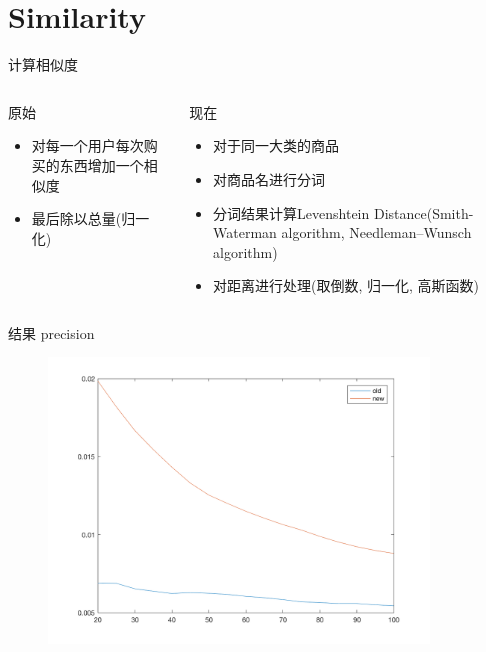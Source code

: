 \documentclass{beamer}
\begin{document}
  \section{Similarity}
  \begin{frame}{计算相似度}
    \begin{columns}
      \begin{column}{0.5\textwidth}
        原始
        \begin{itemize}
          \item 对每一个用户每次购买的东西增加一个相似度
          \item 最后除以总量(归一化)
        \end{itemize}
      \end{column}
      \begin{column}{0.5\textwidth}
        现在
        \begin{itemize}
          \item 对于同一大类的商品
          \item 对商品名进行分词
          \item 分词结果计算Levenshtein Distance(Smith-Waterman algorithm,  Needleman–Wunsch algorithm)
          \item 对距离进行处理(取倒数, 归一化, 高斯函数)
        \end{itemize}
      \end{column}
    \end{columns}
  \end{frame}
  \begin{frame}{结果}
    precision
    \begin{figure}
      \centering\includegraphics[width=0.9\textwidth]{Nov-9/result_1.png}
    \end{figure}
  \end{frame}
\end{document}
